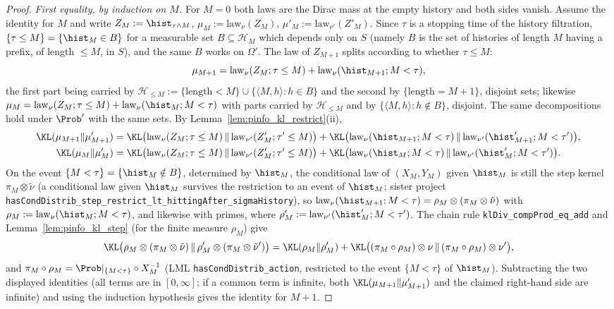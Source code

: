 \begin{proof}
\leanok
\emph{First equality, by induction on $M$.} For $M = 0$ both laws are the Dirac mass at the
empty history and both sides vanish. Assume the identity for $M$ and write
$Z_M := \hist_{\tau\wedge M}$, $\mu_M := \mathrm{law}_\nu(Z_M)$, $\mu'_M := \mathrm{law}_{\nu'}(Z'_M)$.
Since $\tau$ is a stopping time of the history filtration, $\{\tau \le M\} = \{\hist_M \in B\}$
for a measurable set $B \subseteq \mathcal H_M$ which depends only on $S$ (namely $B$ is the set of
histories of length $M$ having a prefix, of length $\le M$, in $S$), and the same $B$ works on
$\Omega'$. The law of $Z_{M+1}$ splits according to whether $\tau \le M$:
\[
  \mu_{M+1} = \mathrm{law}_\nu(Z_M ; \tau\le M) + \mathrm{law}_\nu(\hist_{M+1} ; M < \tau),
\]
the first part being carried by $\mathcal H_{\le M} := \{\text{length} < M\} \cup \{\langle M, h\rangle : h \in B\}$
and the second by $\{\text{length} = M + 1\}$, disjoint sets; likewise
$\mu_M = \mathrm{law}_\nu(Z_M ; \tau \le M) + \mathrm{law}_\nu(\hist_M ; M < \tau)$ with parts
carried by $\mathcal H_{\le M}$ and by $\{\langle M, h\rangle : h \notin B\}$, disjoint. The same
decompositions hold under $\Prob'$ with the same sets. By Lemma~\ref{lem:pinfo_kl_restrict}(ii),
\begin{align*}
  \KL(\mu_{M+1}\|\mu'_{M+1}) &= \KL\big(\mathrm{law}_\nu(Z_M;\tau\le M)\,\|\,\mathrm{law}_{\nu'}(Z'_M;\tau'\le M)\big)
     + \KL\big(\mathrm{law}_\nu(\hist_{M+1}; M<\tau)\,\|\,\mathrm{law}_{\nu'}(\hist'_{M+1}; M<\tau')\big),\\
  \KL(\mu_M\|\mu'_M) &= \KL\big(\mathrm{law}_\nu(Z_M;\tau\le M)\,\|\,\mathrm{law}_{\nu'}(Z'_M;\tau'\le M)\big)
     + \KL\big(\mathrm{law}_\nu(\hist_M; M<\tau)\,\|\,\mathrm{law}_{\nu'}(\hist'_M; M<\tau')\big).
\end{align*}
On the event $\{M < \tau\} = \{\hist_M \notin B\}$, determined by $\hist_M$, the conditional
law of $(X_M, Y_M)$ given $\hist_M$ is still the step kernel $\pi_M \otimes \tilde\nu$ (a
conditional law given $\hist_M$ survives the restriction to an event of $\hist_M$; sister
project \texttt{hasCondDistrib\_step\_restrict\_lt\_hittingAfter\_sigmaHistory}), so
$\mathrm{law}_\nu(\hist_{M+1}; M<\tau) = \rho_M \otimes (\pi_M\otimes\tilde\nu)$ with
$\rho_M := \mathrm{law}_\nu(\hist_M; M < \tau)$, and likewise with primes, where
$\rho'_M := \mathrm{law}_{\nu'}(\hist'_M; M<\tau')$. The chain rule \texttt{klDiv\_compProd\_eq\_add}
and Lemma~\ref{lem:pinfo_kl_step} (for the finite measure $\rho_M$) give
\[
  \KL\big(\rho_M\otimes(\pi_M\otimes\tilde\nu)\,\|\,\rho'_M\otimes(\pi_M\otimes\tilde\nu')\big)
  = \KL(\rho_M\|\rho'_M) + \KL\big((\pi_M\circ\rho_M)\otimes\nu\,\|\,(\pi_M\circ\rho_M)\otimes\nu'\big),
\]
and $\pi_M \circ \rho_M = \Prob|_{\{M<\tau\}}\circ X_M^{-1}$ (LML
\texttt{hasCondDistrib\_action}, restricted to the event $\{M < \tau\}$ of $\hist_M$).
Subtracting the two displayed identities (all terms are in $[0,\infty]$; if a common term is
infinite, both $\KL(\mu_{M+1}\|\mu'_{M+1})$ and the claimed right-hand side are infinite) and
using the induction hypothesis gives the identity for $M + 1$.


\end{proof}
